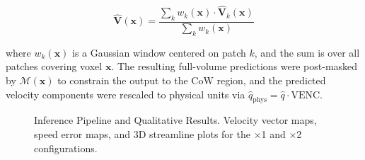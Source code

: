 \begin{equation}
    \hat{\mathbf{V}}(\mathbf{x}) = \frac{\sum_k w_k(\mathbf{x}) \cdot \hat{\mathbf{V}}_k(\mathbf{x})}{\sum_k w_k(\mathbf{x})}
\end{equation}

where $w_k(\mathbf{x})$ is a Gaussian window centered on patch $k$, and the sum is over all patches covering voxel $\mathbf{x}$. The resulting full-volume predictions were post-masked by $\mathcal{M}(\mathbf{x})$ to constrain the output to the CoW region, and the predicted velocity components were rescaled to physical units via $\hat{q}_{\text{phys}} = \hat{q} \cdot \text{VENC}$.

\begin{figure}[h]
    \centering
    \caption{Inference Pipeline and Qualitative Results. Velocity vector maps, speed error maps, and 3D streamline plots for the $\times$1 and $\times$2 configurations.}
    \label{fig:inference}
\end{figure}

%   
%


